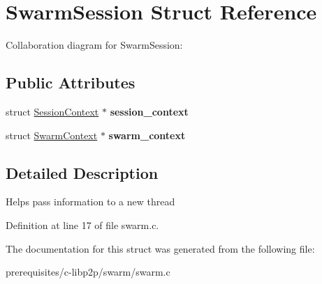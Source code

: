 \hypertarget{struct_swarm_session}{}\section{Swarm\+Session Struct Reference}
\label{struct_swarm_session}


Collaboration diagram for Swarm\+Session\+:
\subsection*{Public Attributes}
\begin{DoxyCompactItemize}
\item 
\mbox{\label{struct_swarm_session_afe9d392f6ba532f3134c7d523614b48d}} 
struct \mbox{\hyperlink{struct_session_context}{Session\+Context}} $\ast$ {\bfseries session\+\_\+context}
\item 
\mbox{\label{struct_swarm_session_aaaacd9e8cd070cad126bbf66ca007826}} 
struct \mbox{\hyperlink{struct_swarm_context}{Swarm\+Context}} $\ast$ {\bfseries swarm\+\_\+context}
\end{DoxyCompactItemize}


\subsection{Detailed Description}
Helps pass information to a new thread 

Definition at line 17 of file swarm.\+c.



The documentation for this struct was generated from the following file\+:\begin{DoxyCompactItemize}
\item 
prerequisites/c-\/libp2p/swarm/swarm.\+c\end{DoxyCompactItemize}
